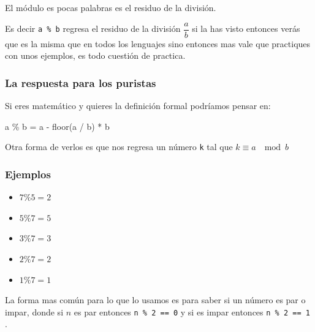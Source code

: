 \documentclass[12pt, fleqn]{report}                             %
\def \Eq {equation}                                             %
\newenvironment{MultiLineEquation*}[1]                          %
        {\begin{\Eq*}\begin{alignedat}{#1}}                         %
        {\end{alignedat}\end{\Eq*}}                                 %
\theoremstyle{break}                                            %
\newcommand{\textCode}[1]  { \texttt{#1} }                      %
\begin{document}
                El módulo es pocas palabras es el residuo de la división.

                Es decir \textCode{a \% b} regresa el residuo de la división $\dfrac{a}{b}$
                si la has visto entonces verás que es la misma que en todos los lenguajes
                sino entonces mas vale que practiques con unos ejemplos, es todo cuestión
                de practica.

                \subsubsection{La respuesta para los puristas}

                    Si eres matemático y quieres la definición formal podríamos pensar en:

                    \begin{MultiLineEquation*}{3}
                        a \% b = a - floor(a / b) \; * \; b
                    \end{MultiLineEquation*}

                    Otra forma de verlos es que nos regresa un número \textCode{k}
                    tal que $k \equiv a \; \mod b$

                \subsubsection{Ejemplos}
                
                    \begin{itemize}
                        \item $7 \% 5 = 2$
                        \item $5 \% 7 = 5$
                        \item $3 \% 7 = 3$
                        \item $2 \% 7 = 2$
                        \item $1 \% 7 = 1$
                    \end{itemize}

                    La forma mas común para lo que lo usamos
                    es para saber si un número es par o impar, donde
                    si $n$ es par entonces \textCode{n \% 2 == 0} y si es impar
                    entonces \textCode{n \% 2 == 1}.
\end{document}
